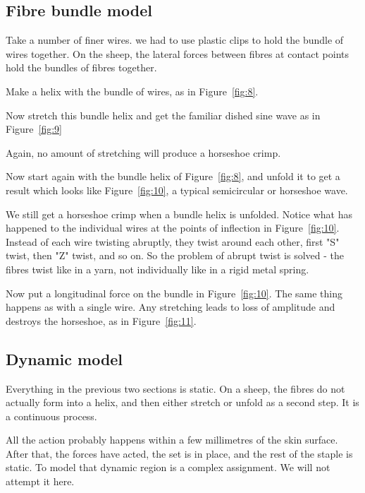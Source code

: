\documentclass[titlepage,10pt]{article}  %
\begin{document}
\subsection{Fibre bundle model}
Take a number of finer wires. we had to use plastic clips to hold the bundle of wires together. On the sheep, the lateral forces between fibres at contact points hold the bundles of fibres together. 

Make a helix with the bundle of wires, as in Figure~\ref{fig:8}.



Now stretch this bundle helix and get the familiar dished sine wave as in Figure~\ref{fig:9}



Again, no amount of stretching will produce a horseshoe crimp.

Now start again with the bundle helix of Figure~\ref{fig:8}, and unfold it to get a result which looks like Figure~\ref{fig:10}, a typical semicircular or horseshoe wave.



We still get a horseshoe crimp when a bundle helix is unfolded. Notice what has happened to the individual wires at the points of inflection in Figure~\ref{fig:10}. Instead of each wire twisting abruptly, they twist around each other, first "S" twist, then "Z" twist, and so on. So the problem of abrupt twist is solved - the fibres twist like in a yarn, not individually like in a rigid metal spring.

Now put a longitudinal force on the bundle in Figure~\ref{fig:10}. The same thing happens as with a single wire. Any stretching leads to loss of amplitude and destroys the horseshoe, as in Figure~\ref{fig:11}.



\subsection{Dynamic model}
\label{sec:dyn}
Everything in the previous two sections is static. On a sheep, the fibres do not actually form into a helix, and then either stretch or unfold as a second step. It is a continuous process.

All the action probably happens within a few millimetres of the skin surface. After that, the forces have acted, the set is in place, and the rest of the staple is static.
To model that dynamic region is a complex assignment. We will not attempt it here.
\end{document}
